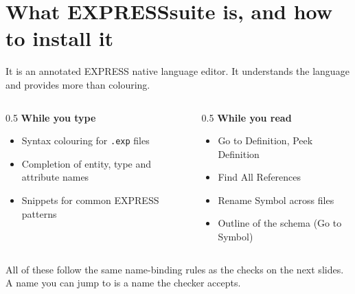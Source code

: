 \documentclass[11pt]{beamer}
\newcommand{\code}[1]{\texttt{#1}}
\begin{document}
\section{What EXPRESSsuite is, and how to install it}

\begin{frame}{It is an annotated EXPRESS native language editor. It understands the language and provides more than colouring.}
  \begin{columns}[T]
    \begin{column}{0.5\textwidth}
      \textbf{While you type}
      \begin{itemize}
        \item Syntax colouring for \code{.exp} files
        \item Completion of entity, type and attribute names
        \item Snippets for common EXPRESS patterns
      \end{itemize}
    \end{column}
    \begin{column}{0.5\textwidth}
      \textbf{While you read}
      \begin{itemize}
        \item Go to Definition, Peek Definition
        \item Find All References
        \item Rename Symbol across files
        \item Outline of the schema (Go to Symbol)
      \end{itemize}
    \end{column}
  \end{columns}
  \medskip
  All of these follow the same name-binding rules as the checks on the next slides.
  A name you can jump to is a name the checker accepts.
\end{frame}
\end{document}
